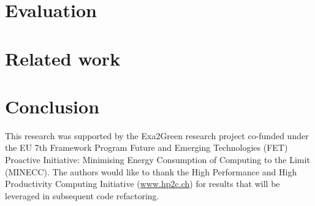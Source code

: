 \documentclass[twocolumn]{svjour3}
\DeclareRobustCommand\IPCClongname{}
\begin{document}
\section{Evaluation}
\label{sec:3}


\section{Related work}
\label{sec:4}


\section{Conclusion}
\label{concl}





\begin{acknowledgements}
This  research  was  supported   by  the  Exa2Green  research  project
co-funded  under the  EU  7th Framework  Program  Future and  Emerging
Technologies (FET) Proactive Initiative: Minimising Energy Consumption
of Computing to  the Limit (MINECC).  The authors  would like to thank
the  High  Performance  and  High  Productivity  Computing  Initiative
(\url{www.hp2c.ch}) for  results that will be  leveraged in subsequent
code refactoring.
\end{acknowledgements}

\DeclareRobustCommand\IPCClongname{ - Intergovernmental Panel on Climate Change}



\end{document}
